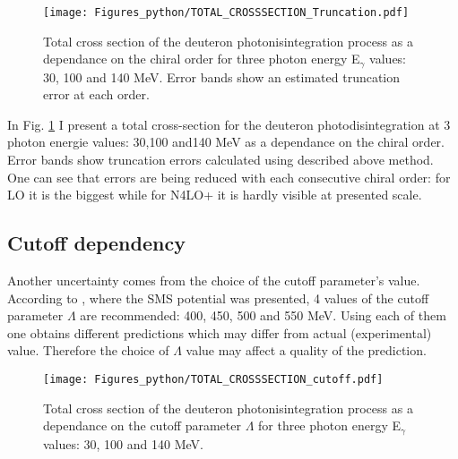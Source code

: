     
    \begin{figure}[h]
        \begin{center}
            \texttt{[image: Figures\_python/TOTAL\_CROSSSECTION\_Truncation.pdf]}
        \end{center}
        \caption{Total cross section of the deuteron photonisintegration
        process as a dependance on the chiral order for three photon energy E$_\gamma$ values: 30, 100 and 140 MeV.
        Error bands show an estimated truncation error at each order.}
        \label{Trunc_100}
    \end{figure}
    
    In Fig. \ref{Trunc_100} I present a total cross-section for the deuteron photodisintegration 
    at 3 photon energie values: 30,100 and140 MeV as a dependance on the chiral order.
    Error bands show truncation errors calculated using described above method.
    One can see that errors are being reduced with each consecutive chiral order: for LO it is the biggest
    while for N4LO+ it is hardly visible at presented scale.


    \subsection*{Cutoff dependency}



    Another uncertainty comes from the choice of the cutoff parameter's value.
   According to \cite{reinkrebs2018}, where the SMS potential was presented,
   4 values of the cutoff parameter $\Lambda$ are recommended: 400, 450, 500 and 550 MeV.
   Using each of them one obtains different predictions which may differ 
   from actual (experimental) value. Therefore the choice of $\Lambda$ value
   may affect a quality of the prediction.


   \begin{figure}[h]
    \begin{center}
        \texttt{[image: Figures\_python/TOTAL\_CROSSSECTION\_cutoff.pdf]}
    \end{center}
    \caption{Total cross section of the deuteron photonisintegration
    process as a dependance on the cutoff parameter $\Lambda$ 
    for three photon energy E$_\gamma$ values: 30, 100 and 140 MeV.}
    \label{Cutoff_dep}
    \end{figure}























